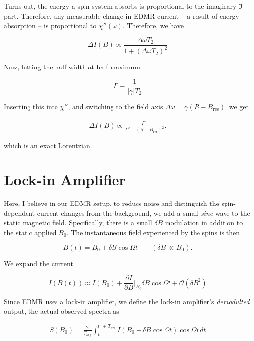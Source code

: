 \documentclass[svgnames]{article}
\begin{document}
Turns out, the energy a spin system absorbs is proportional to the imaginary
$\Im$
part. Therefore, any measurable change in EDMR current -- a result of energy
absorption -- is proportional to $\chi''(\omega) $. Therefore, we have 

\[
\Delta I(B) \propto \frac{\Delta \omega T_2}{1 + (\Delta \omega T_2)^2} 
\] \vspace{3px}

Now, letting the half-width at half-maximum 

\[
\Gamma \equiv \frac{1}{|\gamma| T_2}
\] \vspace{3px}

Inserting this into $\chi''$, and switching to the field axis $\Delta \omega =
\gamma(B - B_\text{res})$, we get 

\begin{align} \label{current}
\Delta I(B) \propto \frac{\Gamma^2}{\Gamma^2 + (B - B_\text{res})^2}. 
\end{align} \vspace{3px}

which is an exact Lorentzian. 

\section{Lock-in Amplifier}

Here, I believe in our EDMR setup, to reduce noise and distinguish the
spin-dependent current changes from the background, we add a small
\textit{sine}-wave to the static magnetic field. Specifically, there is a small
$\delta B$ modulation in addition to the static applied $B_0$. The instantaneous
field experienced by the spins is then 

\[
B(t) = B_0 + \delta B \cos \Omega t \qquad (\delta B \ll B_0).
\] \vspace{3px}


We expand the current 

\[
    I(B(t)) \approx I(B_0) + \frac{\partial I}{\partial B} \Big|_{B_0} \delta B
    \cos \Omega t + \mathcal{O}(\delta B^2)
\] \vspace{3px}


Since EDMR uses a lock-in amplifier, we define the lock-in amplifier's
\textit{demodulted} output, the actual observed spectra as 

\begin{align} \label{lockin}
    S(B_0) = \frac{2}{T_\text{avg} }\int_{t_0}^{t_0 + T_\text{avg} } I(B_0 +
    \delta B \cos \Omega t)\cos\Omega t  \, dt
\end{align}\vspace{3px}
\end{document}
